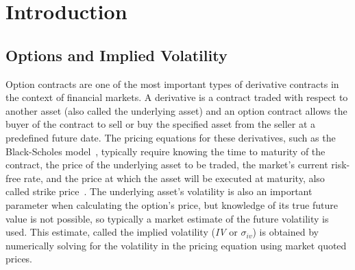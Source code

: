 \section{Introduction}
\label{sec:introduction}

\subsection{Options and Implied Volatility}
\label{subsec:ivs}

Option contracts are one of the most important types of derivative contracts in the context of financial markets.
A derivative is a contract traded with respect to another asset (also called the underlying asset)
and an option contract allows the buyer of the contract to sell or buy the specified asset from the seller at a predefined future date.
The pricing equations for these derivatives, such as the Black-Scholes model~\citep{Black1973}, typically require knowing the time to maturity of the contract,
the price of the underlying asset to be traded, the market's current risk-free rate, and the price at which the asset will be executed at maturity, also called strike price~\citep{Hull2018}.
The underlying asset's volatility is also an important parameter when calculating the option's price,
but knowledge of its true future value is not possible, so typically a market estimate of the future volatility is used.
This estimate, called the implied volatility (\textit{IV} or $\sigma_{iv}$) is obtained
by numerically solving for the volatility in the pricing equation using market quoted prices.

